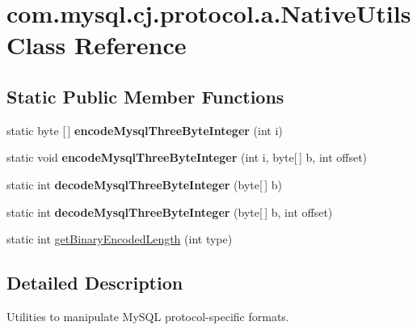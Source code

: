 \hypertarget{classcom_1_1mysql_1_1cj_1_1protocol_1_1a_1_1_native_utils}{}\section{com.\+mysql.\+cj.\+protocol.\+a.\+Native\+Utils Class Reference}
\label{classcom_1_1mysql_1_1cj_1_1protocol_1_1a_1_1_native_utils}
\subsection*{Static Public Member Functions}
\begin{DoxyCompactItemize}
\item 
\mbox{\label{classcom_1_1mysql_1_1cj_1_1protocol_1_1a_1_1_native_utils_a219c3474ed3459976b78e6db24078981}} 
static byte \mbox{[}$\,$\mbox{]} {\bfseries encode\+Mysql\+Three\+Byte\+Integer} (int i)
\item 
\mbox{\label{classcom_1_1mysql_1_1cj_1_1protocol_1_1a_1_1_native_utils_a5965327577eb5373eba1db4543ab62d7}} 
static void {\bfseries encode\+Mysql\+Three\+Byte\+Integer} (int i, byte\mbox{[}$\,$\mbox{]} b, int offset)
\item 
\mbox{\label{classcom_1_1mysql_1_1cj_1_1protocol_1_1a_1_1_native_utils_a6908531afd3be465ad595bbbf4bd7926}} 
static int {\bfseries decode\+Mysql\+Three\+Byte\+Integer} (byte\mbox{[}$\,$\mbox{]} b)
\item 
\mbox{\label{classcom_1_1mysql_1_1cj_1_1protocol_1_1a_1_1_native_utils_aa4d8ecb6bae28aac66f4a6fd53e88cd7}} 
static int {\bfseries decode\+Mysql\+Three\+Byte\+Integer} (byte\mbox{[}$\,$\mbox{]} b, int offset)
\item 
static int \mbox{\hyperlink{classcom_1_1mysql_1_1cj_1_1protocol_1_1a_1_1_native_utils_ac3519c674780b347ccf3b3e4a4c00193}{get\+Binary\+Encoded\+Length}} (int type)
\end{DoxyCompactItemize}


\subsection{Detailed Description}
Utilities to manipulate My\+S\+QL protocol-\/specific formats. 


